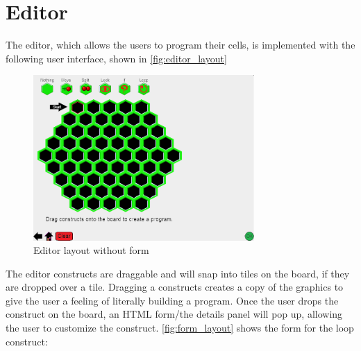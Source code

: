 \section{Editor}
\label{sec:editor}
The editor, which allows the users to program their cells, is implemented with the following user interface, shown in \autoref{fig:editor_layout}

\begin{figure}[ht]
\begin{center}
	\includegraphics[width=0.75\textwidth]{img/editor_layout.png}
	\caption{Editor layout without form}
	\label{fig:editor_layout}
\end{center}
\end{figure}

The editor constructs are draggable and will snap into tiles on the board, if they are dropped over a tile.
Dragging a constructs creates a copy of the graphics to give the user a feeling of literally building a program.
Once the user drops the construct on the board, an HTML form/the details panel will pop up, allowing the user to customize the construct.
\autoref{fig:form_layout} shows the form for the loop construct:

